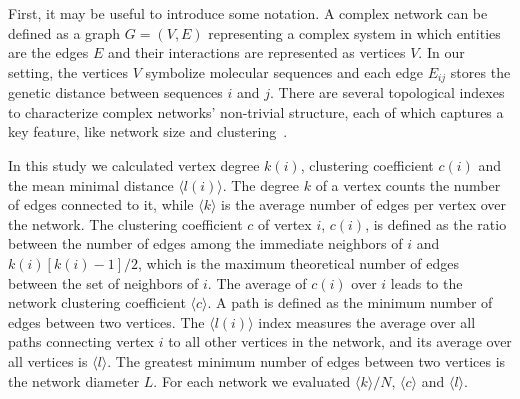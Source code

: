 \documentclass[10pt,letterpaper]{article}
\begin{document}
First, it may be useful to introduce some notation.
A complex network can be defined as a graph $G=(V,E)$ representing a complex system in which entities are the edges $E$ and their interactions are represented as vertices $V$.
In our setting, the vertices $V$ symbolize molecular sequences and each edge $E_{ij}$ stores the genetic distance between sequences $i$ and $j$.
There are several topological indexes to characterize  complex networks' non-trivial structure, each of which captures a key feature, like network size and clustering~\cite{Barabasi2004}.

In this study we calculated vertex degree $k(i)$, clustering coefficient $c(i)$ and the mean minimal distance $\langle l(i)\rangle$.
The degree $k$ of a vertex counts the number of edges connected to it, while $\langle k \rangle$ is the average number of edges per vertex over the network.
The clustering coefficient $c$ of vertex $i$, $c(i)$, is defined as the ratio between the number of edges among the immediate neighbors of $i$ and $k(i)[k(i) -1]/2$, which is the maximum theoretical number of edges between the set of neighbors of $i$.
The average of $c(i)$ over $i$ leads to the network clustering coefficient $\langle c \rangle$.
A path is defined as the minimum number of edges between two vertices.
The $\langle l(i)\rangle$ index measures the average over all paths connecting vertex $i$ to all other vertices in the network, and its average over all vertices is  $\langle l \rangle$.
The greatest minimum number of edges between two vertices is the network diameter $L$.
For each network we evaluated $\langle k \rangle/N$, $\langle c \rangle$ and $\langle l \rangle$.

\end{document}
